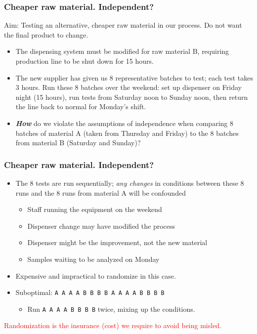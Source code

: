 \begin{frame}\frametitle{Cheaper raw material. Independent?}

	Aim: Testing an alternative, cheaper raw material in our process. Do not want the final product to change.
	\begin{itemize}
		\item The dispensing system must be modified for raw material B, requiring production line to be shut down for 15 hours.
	\end{itemize}
	\begin{itemize}
		\item The new supplier has given us 8 representative batches to test; each test takes 3 hours. Run these 8 batches over the weekend: set up dispenser on Friday night (15 hours), run tests from Saturday noon to Sunday noon, then return the line back to normal for Monday's shift.
	\end{itemize}
	\begin{itemize}
		\item\textbf{\emph{How}} do we violate the assumptions of independence when comparing 8 batches of material A (taken from Thursday and Friday) to the 8 batches from material B (Saturday and Sunday)?
	\end{itemize}
\end{frame}

\begin{frame}\frametitle{Cheaper raw material. Independent?}
	\begin{itemize}
		\item The 8 tests are run sequentially; \emph{any changes} in conditions between these 8 runs and the 8 runs from material A will be confounded
		\begin{itemize}
			\item Staff running the equipment on the weekend
			\item Dispenser change may have modified the process
			\item Dispenser might be the improvement, not the new material
			\item Samples waiting to be analyzed on Monday \pause
		\end{itemize}
	\end{itemize}
	\begin{itemize}
		\item Expensive and impractical to randomize in this case.
		\item Suboptimal: \texttt{A A A A B B B B A A A A B B B B}
		\begin{itemize}
			\item Run \texttt{A A A A B B B B} twice, mixing up the conditions.\pause
		\end{itemize}
	\end{itemize}

	\textcolor{red}{Randomization is the insurance (cost) we require to avoid being misled.}
\end{frame}

